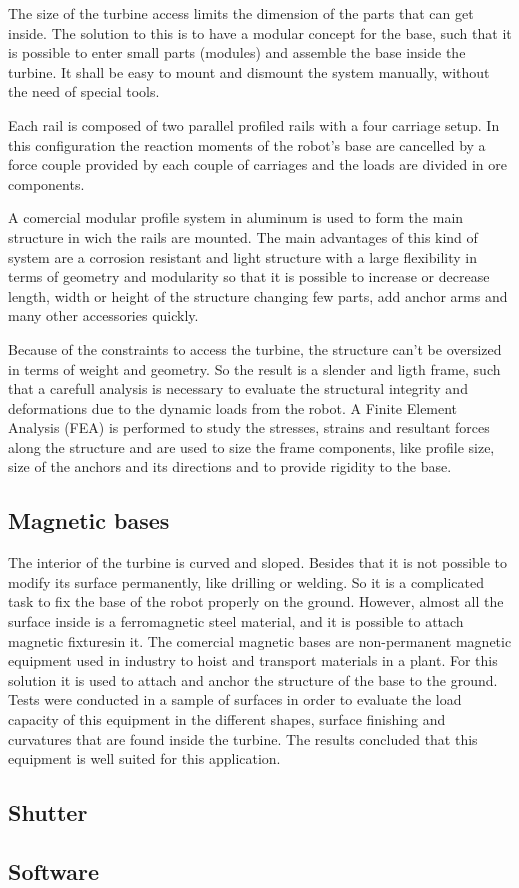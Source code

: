 The size of the turbine access limits the dimension of the parts that can get
inside. The solution to this is to have a modular concept for the base, such
that it is possible to enter small parts (modules) and assemble the base inside
the turbine. It shall be easy to mount and dismount the system manually, without
the need of special tools. 

Each rail is composed of two parallel profiled rails with a four carriage setup.
In this configuration the reaction moments of the robot's base are cancelled by
a force couple provided by each couple of carriages and the loads are divided in
ore components.

A comercial modular profile system in aluminum is used to form the main
structure in wich the rails are mounted. 
The main advantages of this kind of system are a corrosion resistant and light
structure with a large flexibility in terms of geometry and modularity so that
it is possible to increase or decrease length, width or height of the structure
changing few parts, add anchor arms and many other accessories quickly.

Because of the constraints to access the turbine, the structure can't be
oversized in terms of weight and geometry. So the result is a slender and ligth
frame, such that a carefull analysis is necessary to evaluate the structural
integrity and deformations due to the dynamic loads from the robot.
A Finite Element Analysis (FEA) is performed to study the stresses, strains and
resultant forces along the structure and are used to size the frame components,
like profile size, size of the anchors and its directions and to provide rigidity to the
base.


\subsection{Magnetic bases}

The interior of the turbine is curved and sloped. Besides that it is not
possible to modify its surface permanently, like drilling or welding. So it is a
complicated task to fix the base of the robot properly on the ground.
However, almost all the surface inside is a ferromagnetic steel material, and it
is possible to attach magnetic fixturesin it. The comercial magnetic bases are
non-permanent magnetic equipment used in industry to hoist and transport
materials in a plant. For this solution it is used to attach and anchor the
structure of the base to the ground. Tests were conducted in a sample of
surfaces in order to evaluate the load capacity of this
equipment in the different shapes, surface finishing and curvatures that are
found inside the turbine. The results concluded that this equipment is well
suited for this application.



\subsection{Shutter}

\subsection{Software}